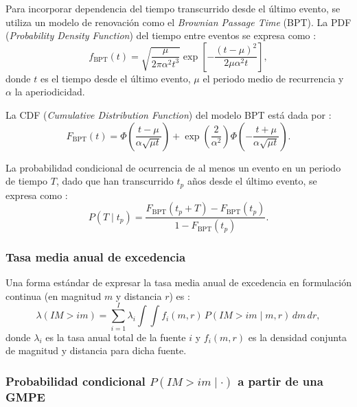 Para incorporar dependencia del tiempo transcurrido desde el último evento, se utiliza un modelo de renovación como el \textit{Brownian Passage Time} (BPT). La PDF (\textit{Probability Density Function}) del tiempo entre eventos se expresa como \cite{MatthewsEllsworthReasenberg2002}:
\begin{equation}
f_{\text{BPT}}(t) = \sqrt{\frac{\mu}{2\pi\alpha^2 t^3}} \exp \left[-\frac{(t-\mu)^2}{2\mu\alpha^2 t}\right],
\label{eq:bpt_pdf_v2}
\end{equation}
donde \(t\) es el tiempo desde el último evento, \(\mu\) el periodo medio de recurrencia y \(\alpha\) la aperiodicidad.

La CDF (\textit{Cumulative Distribution Function}) del modelo BPT está dada por \cite{MatthewsEllsworthReasenberg2002}:
\begin{equation}
F_{\text{BPT}}(t) = \Phi\left(\frac{t - \mu}{\alpha\sqrt{\mu t}}\right) + \exp \left(\frac{2}{\alpha^2}\right)\Phi\left(-\frac{t + \mu}{\alpha\sqrt{\mu t}}\right).
\label{eq:bpt_cdf_v2}
\end{equation}

La probabilidad condicional de ocurrencia de al menos un evento en un periodo de tiempo \(T\), dado que han transcurrido \(t_p\) años desde el último evento, se expresa como \cite{MatthewsEllsworthReasenberg2002}:
\begin{equation}
P(T \mid t_p) = \frac{F_{\text{BPT}}(t_p + T) - F_{\text{BPT}}(t_p)}{1 - F_{\text{BPT}}(t_p)}.
\label{eq:bpt_conditional_probability_v2}
\end{equation}

\subsubsection{Tasa media anual de excedencia}

Una forma estándar de expresar la tasa media anual de excedencia en formulación continua (en magnitud \(m\) y distancia \(r\)) es \cite{BakerBradleyStafford2021}:
\begin{equation}
\lambda(IM > im) = \sum_{i=1}^{I}\lambda_i \int \int f_i(m,r)\,P(IM > im \mid m,r)\,dm\,dr,
\label{eq:lambda_continuous_rate_v2}
\end{equation}
donde \(\lambda_i\) es la tasa anual total de la fuente \(i\) y \(f_i(m,r)\) es la densidad conjunta de magnitud y distancia para dicha fuente.

\subsubsection{\texorpdfstring{Probabilidad condicional \(P(IM > im \mid \cdot)\) a partir de una GMPE}{Probabilidad condicional P(IM > im | ...) a partir de una GMPE}}


